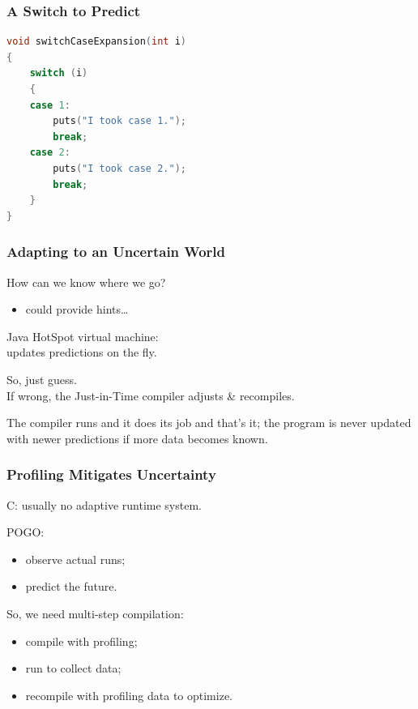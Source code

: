 \begin{frame}[fragile]
\frametitle{A Switch to Predict}
\begin{changemargin}{2cm}
\begin{lstlisting}[language=C,basicstyle=\large]
void switchCaseExpansion(int i)
{
    switch (i)
    {
    case 1:
        puts("I took case 1.");
        break;
    case 2:
        puts("I took case 2.");
        break;
    }
}
\end{lstlisting}
\end{changemargin}
\end{frame}



\begin{frame}
\frametitle{Adapting to an Uncertain World}
\large
\begin{changemargin}{2cm}
How can we know where we go?
\begin{itemize}
\item could provide hints\ldots
\end{itemize}

Java HotSpot virtual machine: \\
updates predictions on the fly. 

So, just guess.\\
If wrong, the Just-in-Time compiler adjusts \& recompiles.

The compiler runs and it does its job and that's it; the program is never updated with newer predictions if more data becomes known.
\end{changemargin}

\end{frame}



\begin{frame}
\frametitle{Profiling Mitigates Uncertainty}

\large
\begin{changemargin}{2cm}
C: usually no adaptive runtime system.

POGO:
\begin{itemize}
\item observe actual runs;
\item predict the future.
\end{itemize}

So, we need multi-step compilation:
\begin{itemize}
\item compile with profiling;
\item run to collect data;
\item recompile with profiling data to optimize.
\end{itemize}

\end{changemargin}

\end{frame}



